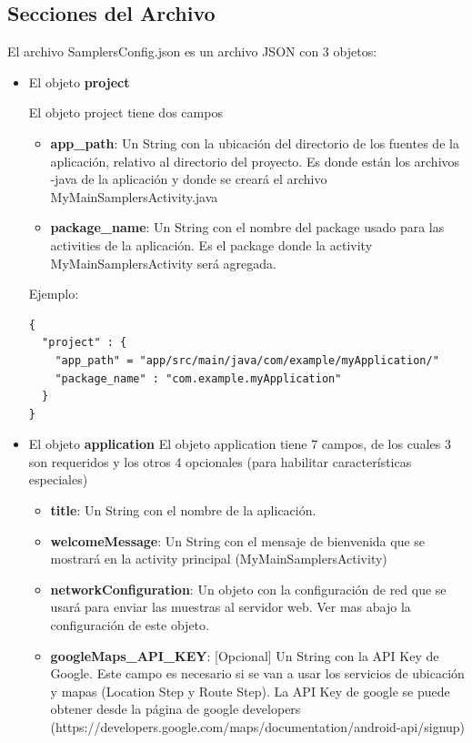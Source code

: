 \subsection{Secciones del Archivo} \label{sec:archivo_config_detallado}

El archivo SamplersConfig.json es un archivo JSON con 3 objetos:
\begin{itemize}
	\item El objeto \textbf{project}
		
	El objeto project tiene dos campos
	\begin{itemize}
		\item \textbf{app\_path}: Un String con la ubicación del directorio de los fuentes de la aplicación, relativo al directorio del proyecto. Es donde están los archivos -java de la aplicación y donde se creará el archivo MyMainSamplersActivity.java
		\item \textbf{package\_name}: Un String con el nombre del package usado para las activities de la aplicación. Es el package donde la activity MyMainSamplersActivity será agregada.
	\end{itemize}
	
Ejemplo:
\begin{lstlisting}[language=XML, frame=tlb]	
{
  "project" : {
    "app_path" = "app/src/main/java/com/example/myApplication/"
    "package_name" : "com.example.myApplication"
  }
}
\end{lstlisting}	
	
	\item El objeto \textbf{application}
	El objeto application tiene 7 campos, de los cuales 3 son requeridos y los otros 4 opcionales (para habilitar características especiales)
	\begin{itemize}
		\item \textbf{title}: Un String con el nombre de la aplicación.
		
		 \item \textbf{welcomeMessage}: Un String con el mensaje de bienvenida que se mostrará en la activity principal (MyMainSamplersActivity)
		 
		 \item \textbf{networkConfiguration}: Un objeto con la configuración de red que se usará para enviar las muestras al servidor web. Ver mas abajo la configuración de este objeto.
		 
		 \item \textbf{googleMaps\_API\_KEY}: [Opcional] Un String con la API Key de Google. Este campo es necesario si se van a usar los servicios de ubicación y mapas (Location Step y Route Step). La API Key de google se puede obtener desde la página de google developers (https://developers.google.com/maps/documentation/android-api/signup)
		 

\end{itemize}
\end{itemize}
